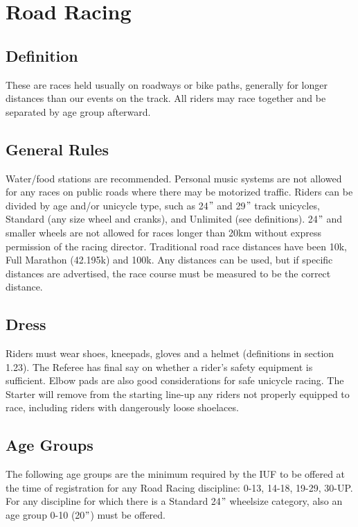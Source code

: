 \chapter{Road Racing \label{chap:road_racing}}

\section{Definition} %
These are races held usually on roadways or bike paths, generally for longer distances than our events on the track.
All riders may race together and be separated by age group afterward.

\section{General Rules}
Water/food stations are recommended.
Personal music systems are not allowed for any races on public roads where there may be motorized traffic.
Riders can be divided by age and/or unicycle type, such as 24$"$ and 29$"$ track unicycles, Standard (any size wheel and cranks), and Unlimited (see definitions).
24$"$ and smaller wheels are not allowed for races longer than 20km without express permission of the racing director.
Traditional road race distances have been 10k, Full Marathon (42.195k) and 100k.
Any distances can be used, but if specific distances are advertised, the race course must be measured to be the correct distance.

\section{Dress}
Riders must wear shoes, kneepads, gloves and a helmet (definitions in section 1.23).
The Referee has final say on whether a rider’s safety equipment is sufficient.
Elbow pads are also good considerations for safe unicycle racing.
The Starter will remove from the starting line-up any riders not properly equipped to race, including riders with dangerously loose shoelaces.

\section{Age Groups}
The following age groups are the minimum required by the IUF to be offered at the time of registration for any Road Racing discipline: 0-13, 14-18, 19-29, 30-UP.
For any discipline for which there is a Standard 24$"$ wheelsize category, also an age group 0-10 (20$"$) must be offered.

